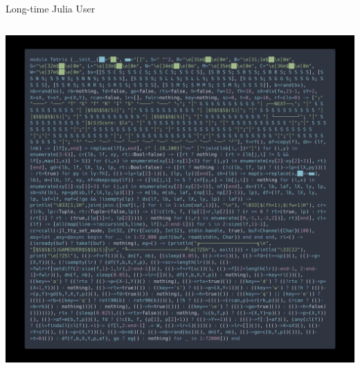 \begin{frame}[fragile]{Long-time Julia User}
\begin{columns}
  \begin{column}{0.45\textwidth}
    \includegraphics[width=\linewidth]{media/tetris-one-liner.png}
    
  \end{column}

\end{columns}

\end{frame}
